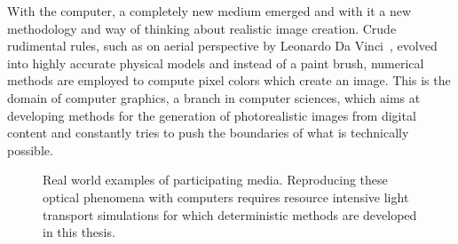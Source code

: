 With the computer, a completely new medium emerged and with it a new methodology and way of thinking about realistic image creation. Crude rudimental rules, such as on aerial perspective by Leonardo Da Vinci~\cite{DaVinci1651}, evolved into highly accurate physical models and instead of a paint brush, numerical methods are employed to compute pixel colors which create an image. This is the domain of computer graphics, a branch in computer sciences, which aims at developing methods for the generation of photorealistic images from digital content and constantly tries to push the boundaries of what is technically possible.
\begin{figure}[ht]
\begin{center}
\end{center}
\caption{Real world examples of participating media. Reproducing these optical phenomena with computers requires resource intensive light transport simulations for which deterministic methods are developed in this thesis\protect\footnotemark.}
\label{fig:intro_participating_media_examples}
\end{figure}

